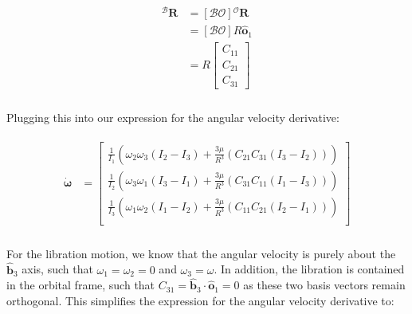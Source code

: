 \documentclass[
]{article}
\begin{document}
\[\begin{aligned}
\begin{aligned}
    {}^\mathcal{B}\boldsymbol{R} &= \left[\mathcal{BO}\right] {}^\mathcal{O}\boldsymbol{R} \\
    &= \left[\mathcal{BO}\right] R \hat{\boldsymbol{o}}_1 \\
    &= R \begin{bmatrix}
        C_{11} \\ C_{21} \\ C_{31}
    \end{bmatrix} \\
\end{aligned}
\end{aligned}\]

Plugging this into our expression for the angular velocity derivative:

\[\begin{aligned}
\begin{aligned}
    \dot{\boldsymbol{\omega}} &= \begin{bmatrix}
        \frac{1}{I_1} \left(\omega_2 \omega_3 \left(I_2 - I_3\right) + \frac{3 \mu}{R^3} \left(C_{21} C_{31} \left(I_3 - I_2\right)\right)\right) \\
        \frac{1}{I_2} \left(\omega_3 \omega_1 \left(I_3 - I_1\right) + \frac{3 \mu}{R^3} \left(C_{31} C_{11} \left(I_1 - I_3\right)\right)\right) \\
        \frac{1}{I_3} \left(\omega_1 \omega_2 \left(I_1 - I_2\right) + \frac{3 \mu}{R^3} \left(C_{11} C_{21} \left(I_2 - I_1\right)\right)\right) \\
    \end{bmatrix} \\
\end{aligned}
\end{aligned}\]

For the libration motion, we know that the angular velocity is purely
about the \(\hat{\boldsymbol{b}}_3\) axis, such that
\(\omega_1 = \omega_2 = 0\) and \(\omega_3 = \omega\). In addition, the
libration is contained in the orbital frame, such that
\(C_{31} = \hat{\boldsymbol{b}}_3 \cdot \hat{\boldsymbol{o}}_1 = 0\) as
these two basis vectors remain orthogonal. This simplifies the
expression for the angular velocity derivative to:
\end{document}
